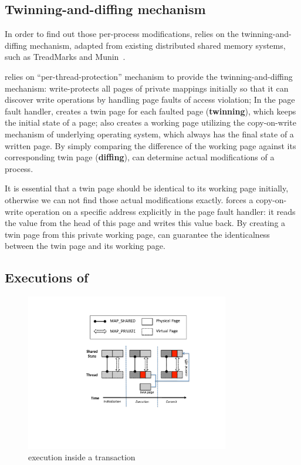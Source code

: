 \subsection{Twinning-and-diffing mechanism}
\label{sec:twinning-and-diffing}
In order to find out those per-process modifications, 
\sheriff{} relies on  the twinning-and-diffing mechanism, 
adapted from existing distributed shared memory systems, such as 
TreadMarks and Munin~\cite{dsm:munin, dsm:treadmarks}.

\sheriff{} relies on ``per-thread-protection'' mechanism to provide the twinning-and-diffing mechanism: 
\sheriff{} write-protects all pages of private mappings initially so that it
can discover write operations by handling page faults of access violation;
In the page fault handler, \sheriff{} creates a twin page for each faulted page (\textbf{twinning}), 
which keeps the initial state of a page;
\sheriff{} also creates a working page utilizing the copy-on-write mechanism of underlying 
operating system, which always has the final state of a written page. 
By simply comparing the difference of the working page against its corresponding twin page 
(\textbf{diffing}), 
\sheriff{} can determine actual modifications of a process.
 
It is essential that a twin page should be identical to its working page initially, 
otherwise we can not find those actual modifications exactly. 
\sheriff{} forces a copy-on-write operation on a specific address explicitly in the page fault handler:
it reads the value from the head of this page and writes this value back. 
By creating a twin page from this private working page, \sheriff{} can guarantee the identicalness between the twin page and its working page.
 
\subsection{Executions of \sheriff{}}
\label{sec:sheriff-execution}

\begin{figure}[!t] 
\centering
\includegraphics[width=3.5in]{fig/sheriffframework.pdf}
\caption{\sheriff{} execution inside a transaction
\label{fig:sheriffoverview}}
\end{figure} 

